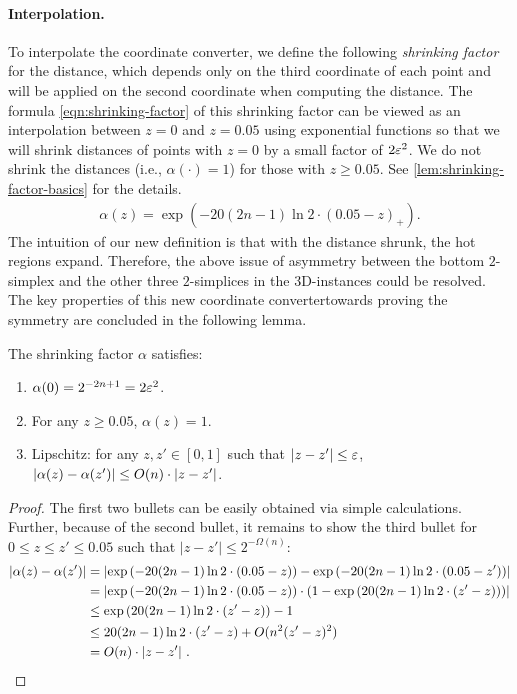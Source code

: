 \paragraph{Interpolation.} To interpolate the coordinate converter, we define the following {\em shrinking factor} 
for the distance, which depends only on the third coordinate of each point and will be applied on the second coordinate when computing the distance.
The formula \cref{eqn:shrinking-factor} of this shrinking factor can be viewed as an interpolation between $z=0$ and $z=0.05$ using exponential functions so that we will shrink distances of points with $z=0$ by a small factor of $2\varepsilon^2$. We do not shrink the distances (i.e., $\alpha(\cdot)=1$) for those with $z\geq 0.05$. 
See \cref{lem:shrinking-factor-basics} for the details.
\begin{align}
    \label{eqn:shrinking-factor}
    \alpha(z) = \exp\left( -20(2n-1)\ln 2 \cdot (0.05-z)_+ \right).
\end{align}
The intuition of our new definition is that with the distance shrunk, the hot regions expand.
Therefore, the above issue of asymmetry between the bottom $2$-simplex and the other three $2$-simplices in the $3${\rm D}-instances could be resolved. 
The key properties of this new coordinate convertertowards proving the symmetry are concluded in the following lemma.
\begin{lemma}
    \label{lem:shrinking-factor-basics}
    The shrinking factor $\alpha$ satisfies:
    \begin{enumerate}[topsep=0.5em, itemsep=0.1em]
        \item $\alpha(0)=2^{-2n+1}=2\varepsilon^{2}$.
        \item For any $z\geq 0.05$, $\alpha(z)=1$.
        \item Lipschitz: for any $z,z'\in [0,1]$ such that $|z-z'|\leq \varepsilon$, $|{\alpha(z)-\alpha(z')} |\leq O(n)\cdot |z-z'|$. 
    \end{enumerate}
\end{lemma}
\begin{proof}
    The first two bullets can be easily obtained via simple calculations. 
    Further, because of the second bullet, it remains to show the third bullet for $0\leq z\leq z' \leq 0.05$ such that $|z-z'|\leq 2^{-\Omega(n)}$:
    \begin{align*}
        \left |{\alpha(z)-\alpha(z')} \right | &= \left |{
            \exp\left( -20(2n-1)\ln 2 \cdot (0.05-z) \right)
            -
            \exp\left( -20(2n-1)\ln 2 \cdot (0.05-z') \right)
        } \right |
        \\
        &=
        \left |{
            \exp\left( -20(2n-1)\ln 2 \cdot (0.05-z) \right) 
            \cdot
            \left(
                1-\exp\left( 20(2n-1)\ln 2 \cdot (z'-z) \right)
            \right)
        } \right |
        \\
        &\leq
        \exp\left( 20(2n-1)\ln 2 \cdot (z'-z) \right)-1
        \\
        &\leq 
        20(2n-1)\ln 2\cdot (z'-z) + O(n^2(z'-z)^2) 
        \\
        &= O(n)\cdot |z-z'|~.
        \qedhere
    \end{align*}
\end{proof}

